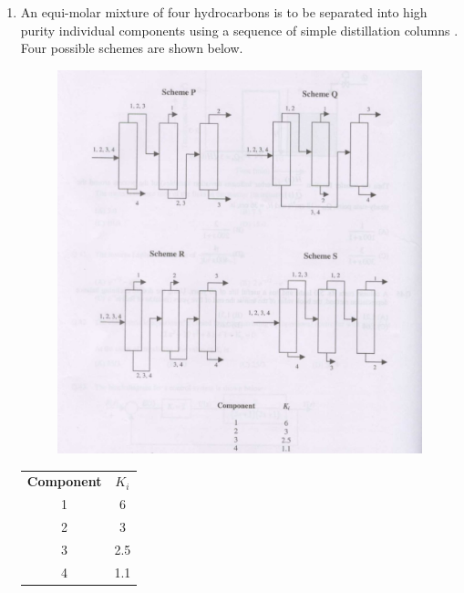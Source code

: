 \documentclass[journal,12pt,onecolumn]{IEEEtran}
\theoremstyle{remark}
\begin{document}
\begin{enumerate}
		\hfill {}
		
		\item An equi-molar mixture of four hydrocarbons  is to be separated into high purity individual components using a sequence of simple distillation columns . Four possible schemes are shown below.
		\begin{figure}[H]
			\centering
			\includegraphics[width = 0.7\columnwidth]{q46.png}
			\caption{}
			\label{fig:Q46}
		\end{figure}
		\begin{center}
			\begin{tabular}{ c c }
				\textbf{Component} &\textbf{$K_{i}$} \\
				1 & 6 \\
				2 & 3 \\
				3 & 2.5 \\
				4 & 1.1
			\end{tabular}
		\end{center} 
		
		\begin{enumerate}
		\end{enumerate} 
		
		\hfill {}
		

\end{enumerate}
\end{document}

